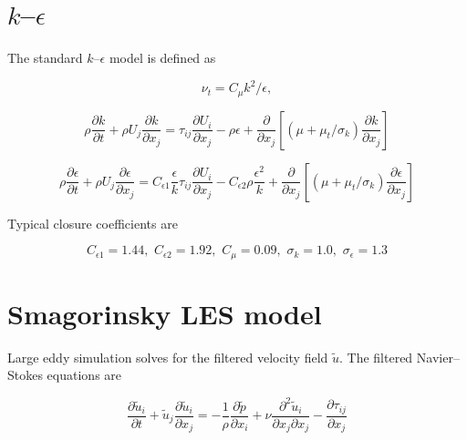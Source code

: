 \section{$k$--$\epsilon$}

The standard $k$--$\epsilon$ model is defined as \cite{Wilcox1994}

\begin{equation}
    \nu_t = C_\mu k^2 / \epsilon,
    \label{eq:kepsilon-nut}
\end{equation}

\begin{equation}
    \rho \frac{\partial k}{\partial t}
    + \rho U_j \frac{\partial k}{\partial x_j}
    = \tau_{ij} \frac{\partial U_i}{\partial x_j}
    - \rho \epsilon
    + \frac{\partial}{\partial x_j}
    \left[
    (\mu + \mu_t/\sigma_k) \frac{\partial k}{\partial x_j}
    \right]
    \label{eq:kepsilon-k}
\end{equation}

\begin{equation}
    \rho \frac{\partial \epsilon}{\partial t}
    + \rho U_j \frac{\partial \epsilon}{\partial x_j}
    = C_{\epsilon 1} \frac{\epsilon}{k} \tau_{ij}
    \frac{\partial U_i}{\partial x_j}
    - C_{\epsilon 2} \rho \frac{\epsilon^2}{k}
    + \frac{\partial}{\partial x_j}
    \left[
    (\mu + \mu_t/\sigma_k) \frac{\partial \epsilon}{\partial x_j}
    \right]
    \label{eq:kepsilon-epsilon}
\end{equation}

Typical closure coefficients are

\begin{equation}
    C_{\epsilon 1} = 1.44, \, \,
    C_{\epsilon 2} = 1.92, \, \,
    C_\mu = 0.09, \, \,
    \sigma_k = 1.0, \, \,
    \sigma_\epsilon = 1.3
\end{equation}


\section{Smagorinsky LES model}

Large eddy simulation solves for the filtered velocity field $\tilde{u}$. The
filtered Navier--Stokes equations are


\begin{equation}
    \frac{\partial \tilde{u}_i}{\partial t}
    + \tilde{u}_j \frac{\partial \tilde{u}_i}{\partial x_j}
    = - \frac{1}{\rho} \frac{\partial \tilde{p}}{\partial x_i}
    + \nu \frac{\partial^2 \tilde{u}_i}{\partial x_j \partial x_j}
    - \frac{\partial \tau_{ij}}{\partial x_j}
    \label{eq:filtered-ns}
\end{equation}

